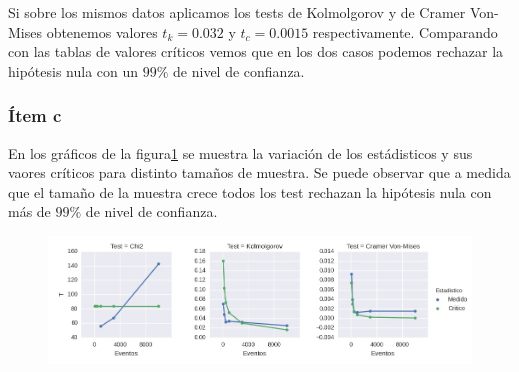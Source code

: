 Si sobre los mismos datos aplicamos los tests de Kolmolgorov y de Cramer Von-Mises obtenemos valores $t_k=0.032$ y $t_c=0.0015$ respectivamente.
Comparando con las tablas de valores críticos vemos que en los dos casos podemos rechazar la hipótesis nula con un $99\%$ de nivel de confianza.

\subsubsection*{Ítem c}
En los gráficos de la figura\ref{fig:fig3} se muestra la variación de los estádisticos y sus vaores críticos para distinto tamaños de muestra.
Se puede observar que a medida que el tamaño de la muestra crece todos los test rechazan la hipótesis nula con más de $99\%$ de nivel de confianza.

\begin{figure}
\centering
\includegraphics[width=\textwidth]{fig3.jpg}
\caption[]{}
\label{fig:fig3}
\end{figure}

